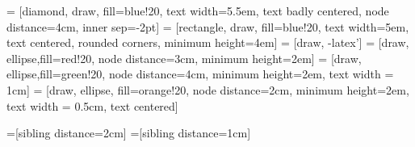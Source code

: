 \documentclass[landscape]{article}
\begin{document}
\pagestyle{empty}


 = [diamond, draw, fill=blue!20, 
    text width=5.5em, text badly centered, node distance=4cm, inner sep=-2pt]
 = [rectangle, draw, fill=blue!20, 
    text width=5em, text centered, rounded corners, minimum height=4em]
 = [draw, -latex']
 = [draw, ellipse,fill=red!20, node distance=3cm,
    minimum height=2em]
 = [draw, ellipse,fill=green!20, node distance=4cm,
    minimum height=2em, text width = 1cm]
 = [draw, ellipse, fill=orange!20, node distance=2cm,
    minimum height=2em, text width = 0.5cm, text centered]

=[sibling distance=2cm]
=[sibling distance=1cm]
    
\end{document}
